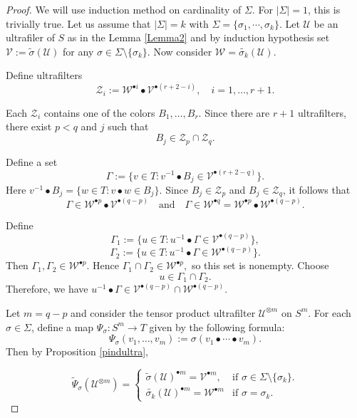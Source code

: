 \documentclass[10pt,a4paper]{amsart}
\begin{document}
\begin{proof}
We will use induction method on cardinality of $\Sigma.$ For $|\Sigma|=1$, this is trivially true. Let us assume that $|\Sigma|=k$ with $\Sigma= \{\sigma_1, \cdots, \sigma_k\}$. 
Let $\mathcal{U}$ be an ultrafiler of $S$ as in the Lemma \ref{Lemma2} and by induction hypothesis set $\mathcal{V} := \widetilde{\sigma}(\mathcal{U})$ for any $\sigma \in \Sigma \setminus  \{\sigma_k\}$. Now consider $\mathcal{W }= \widetilde{\sigma_k}(\mathcal{U}).$

Define ultrafilters
\[
\mathcal{Z}_{i} := \mathcal{W}^{\bullet i} \bullet \mathcal{V}^{\bullet (r+2-i)}, \quad i=1,\dots,r+1.
\]

Each $\mathcal{Z}_i$ contains one of the colors $B_1,\dots,B_r$. Since there are $r+1$ ultrafilters, there exist $p<q$ and $j$ such that
\[
B_j \in \mathcal{Z}_p \cap \mathcal{Z}_q.
\]

Define a set
\[
\Gamma := \{ v \in T : v^{-1} \bullet B_j \in \mathcal{V}^{\bullet (r+2-q)} \} 
.\]
Here $v^{-1} \bullet B_j= \{w \in T : v\bullet w \in B_j\}.$
Since $B_j \in \mathcal{Z}_p$ and $B_j \in \mathcal{Z}_q$, it follows that
\[
\Gamma \in \mathcal{W}^{\bullet p} \bullet \mathcal{V}^{\bullet (q-p)} \quad \text{and} \quad
\Gamma \in \mathcal{W}^{\bullet q} = \mathcal{W}^{\bullet p} \bullet \mathcal{W}^{\bullet (q-p)}.
\]

Define
\[
\Gamma_1 := \{ u \in T : u^{-1} \bullet \Gamma \in \mathcal{V}^{\bullet (q-p)} \},
\]
\[
\Gamma_2 := \{ u \in T : u^{-1}\bullet \Gamma \in \mathcal{W}^{\bullet (q-p)} \}.
\]
Then $\Gamma_1, \Gamma_2 \in \mathcal{W}^{\bullet p}$.
Hence $\Gamma_1\cap\Gamma_2\in\mathcal{W}^{\bullet p},$ so this set is nonempty. Choose
\[
u\in \Gamma_1\cap\Gamma_2.
\]
Therefore, we have $u^{-1} \bullet \Gamma \in \mathcal{V}^{\bullet (q-p)} \cap \mathcal{W}^{\bullet (q-p)}.$

Let $m = q-p$ and consider the tensor product ultrafilter $\mathcal{U}^{\otimes m}$ on $S^m$. For each $\sigma \in \Sigma$, define a map $\Psi_\sigma : S^m \to T$ given by the following formula:
\[
\Psi_\sigma(v_1,\dots,v_m) := \sigma(v_1 \bullet \cdots \bullet v_m).
\]
Then by Proposition \ref{pindultra},

\[
\widetilde{\Psi}_\sigma(\mathcal{U}^{\otimes m})
=
\begin{cases}
\widetilde{\sigma}(\mathcal{U})^{\bullet m}
=\mathcal{V}^{\bullet m},
& \text{if } \sigma\in \Sigma\setminus\{\sigma_k\}.\\ \widetilde{\sigma_k}(\mathcal{U})^{\bullet m} = \mathcal{W}^{\bullet m} & \text{if } \sigma=\sigma_k.
\end{cases}
\]


\end{proof}
\end{document}
